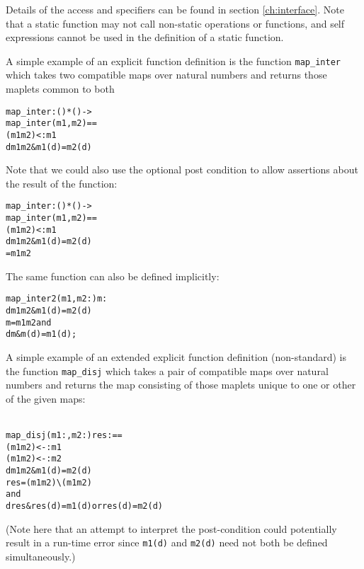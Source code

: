 \documentclass[\pformat,12pt]{article}
\begin{document}
Details of the access and  specifiers can be found in
section \ref{ch:interface}. Note that a static function may not call
non-static operations or functions, and self expressions cannot be
used in the definition of a static function.

A simple example of an explicit function definition is the function
\texttt{map\_inter} which takes two compatible maps over natural
numbers and returns those maplets common to both
\begin{alltt}
  map_inter: () * () -> 
  map_inter (m1,m2) ==
    ( m1   m2) <: m1
    d  m1  m2 & m1(d) = m2(d)
\end{alltt}
Note that we could also use the optional post condition to allow
assertions about the result of the function:
\begin{alltt}
  map_inter: () * () -> 
  map_inter (m1,m2) ==
    ( m1   m2) <: m1
    d  m1  m2 & m1(d) = m2(d)
     =  m1   m2
\end{alltt}

The same function can also be defined implicitly:
\begin{alltt}
  map_inter2 (m1,m2: ) m: 
    d  m1  m2 & m1(d) = m2(d)
    m =  m1  m2 and
        d  m & m(d) = m1(d);
\end{alltt}

A simple example of an extended explicit function definition
(non-standard) is the function \texttt{map\_disj} which takes a pair of
compatible maps over natural numbers and returns the map consisting of
those maplets unique to one or other of the given maps:

\begin{alltt}\label{mapdisj}
  map_disj (m1:,m2:) res :  ==
    ( m1  m2) <-: m1 
    ( m1  m2) <-: m2
    d  m1  m2 & m1(d) = m2(d)
    res = ( m1  m2) \verb+\+ ( m1  m2) 
       and
        d  res & res(d) = m1(d) or res(d) = m2(d)
\end{alltt}
(Note here that an attempt to interpret the post-condition could
potentially result in a run-time error since \texttt{m1(d)} and
\texttt{m2(d)} need not both be defined simultaneously.)
\end{document}
